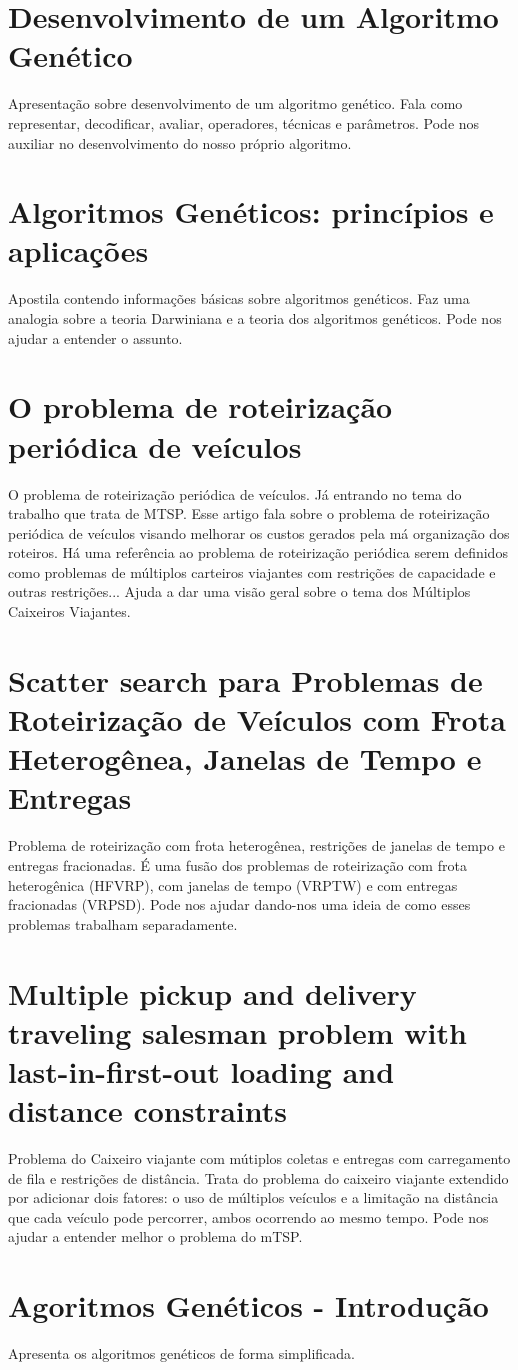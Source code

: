 \documentclass[12pt,openright,a4paper]{abntex2}
\begin{document}
\section{Desenvolvimento de um Algoritmo Genético}
Apresentação sobre desenvolvimento de um algoritmo genético. Fala como representar, 
decodificar, avaliar, operadores, técnicas e parâmetros. Pode nos auxiliar no 
desenvolvimento do nosso próprio algoritmo. \cite{0003-pdf}
\\

\section{Algoritmos Genéticos: princípios e aplicações}
Apostila contendo informações básicas sobre algoritmos genéticos. Faz uma analogia 
sobre a teoria Darwiniana e a teoria dos algoritmos genéticos. Pode nos ajudar a 
entender o assunto. \cite{0004-pdf}
\\

\section{O problema de roteirização periódica de veículos}
O problema de roteirização periódica de veículos. Já entrando no tema do trabalho que trata de MTSP. 
Esse artigo fala sobre o problema de roteirização periódica de veículos visando melhorar os custos 
gerados pela má organização dos roteiros. Há uma referência ao problema de roteirização periódica 
serem definidos como problemas de múltiplos carteiros viajantes com restrições de capacidade e outras 
restrições... Ajuda a dar uma visão geral sobre o tema dos Múltiplos Caixeiros Viajantes. \cite{0005-pdf}
\\

\section{Scatter search para Problemas de Roteirização de Veículos com Frota Heterogênea, Janelas de Tempo e Entregas}
Problema de roteirização com frota heterogênea, restrições de janelas de tempo e entregas fracionadas. 
É uma fusão dos problemas de roteirização com frota heterogênica (HFVRP), com janelas de tempo (VRPTW)
e com entregas fracionadas (VRPSD). Pode nos ajudar dando-nos uma ideia de como esses problemas trabalham 
separadamente.\cite{0006-pdf}
\\

\section{Multiple pickup and delivery traveling salesman problem with last-in-first-out loading and distance constraints}
Problema do Caixeiro viajante com mútiplos coletas e entregas com carregamento de fila e restrições 
de distância. Trata do problema do caixeiro viajante extendido por adicionar dois fatores: o uso 
de múltiplos veículos e a limitação na distância que cada veículo pode percorrer, ambos ocorrendo 
ao mesmo tempo. Pode nos ajudar a entender melhor o problema do mTSP. \cite{0007-pdf}
\\

\section{Agoritmos Genéticos - Introdução}
Apresenta os algoritmos genéticos de forma simplificada. \cite{0008-pdf}

\postextual


\end{document}
